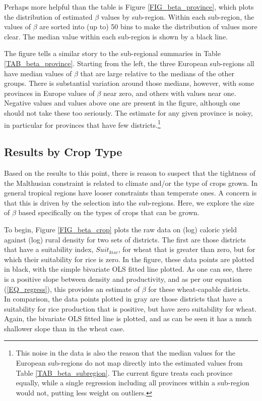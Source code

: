 \documentclass[11pt]{article}
\begin{document}
Perhaps more helpful than the table is Figure \ref{FIG_beta_province}, which plots the distribution of estimated $\beta$ values by sub-region. Within each sub-region, the values of $\beta$ are sorted into (up to) 50 bins to make the distribution of values more clear. The median value within each sub-region is shown by a black line. 

The figure tells a similar story to the sub-regional summaries in Table \ref{TAB_beta_province}. Starting from the left, the three European sub-regions all have median values of $\beta$ that are large relative to the medians of the other groups. There is substantial variation around those medians, however, with some provinces in Europe values of $\beta$ near zero, and others with values near one. Negative values and values above one are present in the figure, although one should not take these too seriously. The estimate for any given province is noisy, in particular for provinces that have few districts.\footnote{This noise in the data is also the reason that the median values for the European sub-regions do not map directly into the estimated values from Table \ref{TAB_beta_subregion}. The current figure treats each province equally, while a single regression including all provinces within a sub-region would not, putting less weight on outliers.}

\subsection{Results by Crop Type}
Based on the results to this point, there is reason to suspect that the tightness of the Malthusian constraint is related to climate and/or the type of crops grown. In general tropical regions have looser constraints than temperate ones. A concern is that this is driven by the selection into the sub-regions. Here, we explore the size of $\beta$ based specifically on the types of crops that can be grown.

To begin, Figure \ref{FIG_beta_crop} plots the raw data on (log) caloric yield against (log) rural density for two sets of districts. The first are those districts that have a suitability index, $Suit_{kisc}$, for wheat that is greater than zero, but for which their suitability for rice is zero. In the figure, these data points are plotted in black, with the simple bivariate OLS fitted line plotted. As one can see, there is a positive slope between density and productivity, and as per our equation (\ref{EQ_regress}), this provides an estimate of $\beta$ for these wheat-capable districts. In comparison, the data points plotted in gray are those districts that have a suitability for rice production that is positive, but have zero suitability for wheat. Again, the bivariate OLS fitted line is plotted, and as can be seen it has a much shallower slope than in the wheat case.
\end{document}
